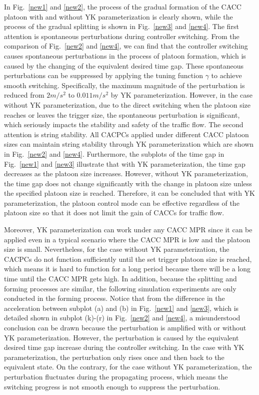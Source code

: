 \documentclass[journal]{IEEEtran}
\begin{document}
In Fig.~\ref{new1} and \ref{new2}, the process of the gradual formation of the CACC platoon with and without YK parameterization is clearly shown, while the process of the gradual splitting is shown in Fig.~\ref{new3} and \ref{new4}. The first attention is spontaneous perturbations during controller switching. From the comparison of Fig.~\ref{new2} and \ref{new4}, we can find that the controller switching causes spontaneous perturbations in the process of platoon formation, which is caused by the changing of the equivalent desired time gap. These spontaneous perturbations can be suppressed by applying the tuning function $\gamma$ to achieve smooth switching. Specifically, the maximum magnitude of the perturbation is reduced from $2 m/s^{2}$ to $0.011 m/s^{2}$ by YK parameterization. However, in the case without YK parameterization, due to the direct switching when the platoon size reaches or leaves the trigger size, the spontaneous perturbation is significant, which seriously impacts the stability and safety of the traffic flow. The second attention is string stability. All CACPCs applied under different CACC platoon sizes can maintain string stability through YK parameterization which are shown in Fig.~\ref{new2} and \ref{new4}. Furthermore, the subplots of the time gap in Fig.~\ref{new1} and \ref{new3} illustrate that with YK parameterization, the time gap decreases as the platoon size increases. However, without YK parameterization, the time gap does not change significantly with the change in platoon size unless the specified platoon size is reached. Therefore, it can be concluded that with YK parameterization, the platoon control mode can be effective regardless of the platoon size so that it does not limit the gain of CACCs for traffic flow.


Moreover, YK parameterization can work under any CACC MPR since it can be applied even in a typical scenario where the CACC MPR is low and the platoon size is small. Nevertheless, for the case without YK parameterization, the CACPCs do not function sufficiently until the set trigger platoon size is reached, which means it is hard to function for a long period because there will be a long time until the CACC MPR gets high. In addition, because the splitting and forming processes are similar, the following simulation experiments are only conducted in the forming process. Notice that from the difference in the acceleration between subplot (a) and (b) in Fig.~\ref{new1} and \ref{new3}, which is detailed shown in subplot (k)-(r) in Fig.~\ref{new2} and \ref{new4}, a misunderstood conclusion can be drawn because the perturbation is amplified with or without YK parameterization. However, the perturbation is caused by the equivalent desired time gap increase during the controller switching. In the case with YK parameterization, the perturbation only rises once and then back to the equivalent state. On the contrary, for the case without YK parameterization, the perturbation fluctuates during the propagating process, which means the switching progress is not smooth enough to suppress the perturbation.
\end{document}
